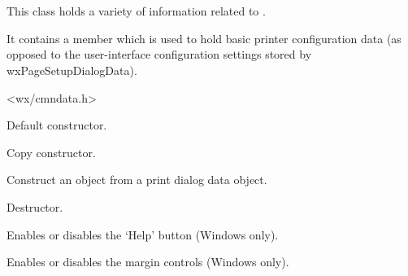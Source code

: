 \section{}\label{wxpagesetupdialogdata}

This class holds a variety of information related to .

It contains a  member which is used to hold basic printer configuration data (as opposed to the
user-interface configuration settings stored by wxPageSetupDialogData).




<wx/cmndata.h>






Default constructor.


Copy constructor.


Construct an object from a print dialog data object.



Destructor.

\label{wxpagesetupdialogdataenablehelp}


Enables or disables the `Help' button (Windows only).

\label{wxpagesetupdialogdataenablemargins}


Enables or disables the margin controls (Windows only).

